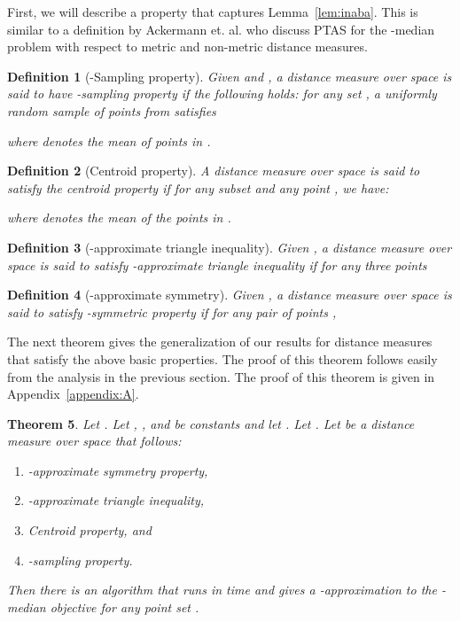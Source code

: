 \documentclass[a4paper]{article}
\newtheorem{theorem}{Theorem}
\newtheorem{definition}[theorem]{Definition}
\begin{document}
First, we will describe a property that captures Lemma~\ref{lem:inaba}. This is similar to a definition by Ackermann et. al. \cite{abs10} who discuss PTAS for the -median problem with respect to metric and non-metric distance measures.

\begin{definition}[-Sampling property]
Given  and , a distance measure  over space  is said to have -sampling property if the following holds:
for any set , a uniformly random sample  of  points from  satisfies

where  denotes the mean of points in .
\end{definition}

\begin{definition}[Centroid property]
A distance measure  over space  is said to satisfy the centroid property if for any subset  and any point , we have:

where  denotes the mean of the points in .
\end{definition}

\begin{definition}[-approximate triangle inequality]
Given , a distance measure  over space  is said to satisfy -approximate triangle inequality if for any three points 
\end{definition}

\begin{definition}[-approximate symmetry]
Given , a distance measure  over space  is said to satisfy -symmetric property if for any pair of points , 
\end{definition}

The next theorem gives the generalization of our results for distance measures that satisfy the above basic properties. The proof of this theorem follows easily  from the analysis in the previous section. 
The proof of this theorem is given in Appendix~\ref{appendix:A}.

\begin{theorem}\label{thm:other}
Let . Let , , and  be constants and let . Let . Let  be a distance measure over space  that  follows:
\begin{enumerate}
\item -approximate symmetry property,

\item -approximate triangle inequality,

\item Centroid property, and

\item -sampling property.
\end{enumerate}
Then there is an algorithm that runs in time  and gives a -approximation to the -median objective for any point set .
\end{theorem}
\end{document}
